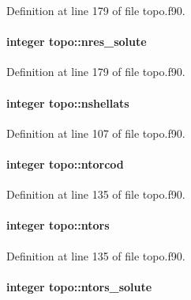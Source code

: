 Definition at line 179 of file topo.\-f90.

\hypertarget{classtopo_a2871deb545ab811525581a49954a4b09}{
\paragraph[{nres\-\_\-solute}]{\setlength{\rightskip}{0pt plus 5cm}integer topo\-::nres\-\_\-solute}}\label{classtopo_a2871deb545ab811525581a49954a4b09}


Definition at line 179 of file topo.\-f90.

\hypertarget{classtopo_aab63f01b0844c9dd5b6c57b7257825d7}{
\paragraph[{nshellats}]{\setlength{\rightskip}{0pt plus 5cm}integer topo\-::nshellats}}\label{classtopo_aab63f01b0844c9dd5b6c57b7257825d7}


Definition at line 107 of file topo.\-f90.

\hypertarget{classtopo_a78b13d042014360bfeba5ccbc35d0bd0}{
\paragraph[{ntorcod}]{\setlength{\rightskip}{0pt plus 5cm}integer topo\-::ntorcod}}\label{classtopo_a78b13d042014360bfeba5ccbc35d0bd0}


Definition at line 135 of file topo.\-f90.

\hypertarget{classtopo_abe9f7f9ff31ba9e2bf07d57eba011599}{
\paragraph[{ntors}]{\setlength{\rightskip}{0pt plus 5cm}integer topo\-::ntors}}\label{classtopo_abe9f7f9ff31ba9e2bf07d57eba011599}


Definition at line 135 of file topo.\-f90.

\hypertarget{classtopo_aec92d2102078e497ee2a6d2fa66bce7c}{
\paragraph[{ntors\-\_\-solute}]{\setlength{\rightskip}{0pt plus 5cm}integer topo\-::ntors\-\_\-solute}}\label{classtopo_aec92d2102078e497ee2a6d2fa66bce7c}


